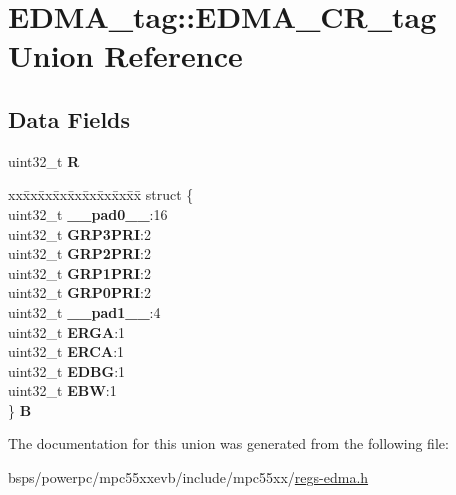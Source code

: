\hypertarget{unionEDMA__tag_1_1EDMA__CR__tag}{}\section{E\+D\+M\+A\+\_\+tag\+::E\+D\+M\+A\+\_\+\+C\+R\+\_\+tag Union Reference}
\label{unionEDMA__tag_1_1EDMA__CR__tag}
\subsection*{Data Fields}
\begin{DoxyCompactItemize}
\item 
\mbox{\label{unionEDMA__tag_1_1EDMA__CR__tag_a4bb79781bc8fc74d5ac4d0da09e82287}} 
uint32\+\_\+t {\bfseries R}
\item 
\mbox{\label{unionEDMA__tag_1_1EDMA__CR__tag_aa4a68351fbf86f3a404b8a430d54d3bc}} 
\begin{tabbing}
xx\=xx\=xx\=xx\=xx\=xx\=xx\=xx\=xx\=\kill
struct \{\\
\>uint32\_t {\bfseries \_\_pad0\_\_}:16\\
\>uint32\_t {\bfseries GRP3PRI}:2\\
\>uint32\_t {\bfseries GRP2PRI}:2\\
\>uint32\_t {\bfseries GRP1PRI}:2\\
\>uint32\_t {\bfseries GRP0PRI}:2\\
\>uint32\_t {\bfseries \_\_pad1\_\_}:4\\
\>uint32\_t {\bfseries ERGA}:1\\
\>uint32\_t {\bfseries ERCA}:1\\
\>uint32\_t {\bfseries EDBG}:1\\
\>uint32\_t {\bfseries EBW}:1\\
\} {\bfseries B}\\

\end{tabbing}\end{DoxyCompactItemize}


The documentation for this union was generated from the following file\+:\begin{DoxyCompactItemize}
\item 
bsps/powerpc/mpc55xxevb/include/mpc55xx/\mbox{\hyperlink{regs-edma_8h}{regs-\/edma.\+h}}\end{DoxyCompactItemize}

